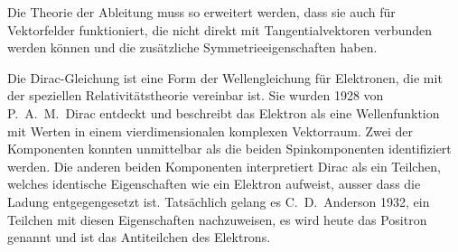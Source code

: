 \begin{aufgabe}
Die Theorie der Ableitung muss so erweitert werden, dass sie auch für
Vektorfelder funktioniert, die nicht direkt mit Tangentialvektoren
verbunden werden können und die zusätzliche Symmetrieeigenschaften
haben.
\end{aufgabe}

Die Dirac-Gleichung ist eine Form der Wellengleichung für Elektronen,
die mit der speziellen Relativitätstheorie vereinbar ist.
Sie wurden 1928 von P.~A.~M.~Dirac entdeckt und beschreibt das Elektron
als eine Wellenfunktion mit Werten in einem vierdimensionalen komplexen
Vektorraum.
Zwei der Komponenten konnten unmittelbar als die beiden Spinkomponenten
identifiziert werden.
Die anderen beiden Komponenten interpretiert Dirac als ein Teilchen,
welches identische Eigenschaften wie ein Elektron aufweist, ausser dass
die Ladung entgegengesetzt ist.
Tatsächlich gelang es C.~D.~Anderson 1932, ein Teilchen mit diesen
Eigenschaften nachzuweisen, es wird heute das Positron genannt und ist
das Antiteilchen des Elektrons.





